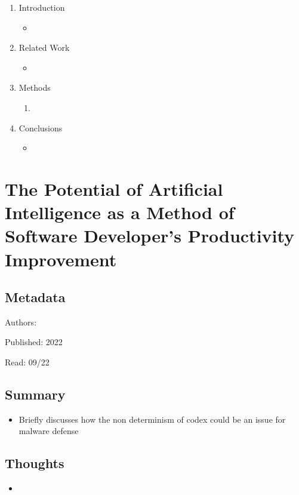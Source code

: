 \documentclass{article}
\begin{document}
\begin{enumerate}
	\item Introduction
	\begin{itemize}
		\item 
	\end{itemize}
	\item Related Work
	\begin{itemize}
		\item 
	\end{itemize}
	\item Methods
	\begin{enumerate}
		\item 
	\end{enumerate}
	\item Conclusions
	\begin{itemize}
		\item 
	\end{itemize}
\end{enumerate}

\pagebreak


\section*{The Potential of Artificial Intelligence as a Method of Software Developer's Productivity Improvement}

\subsection*{Metadata}

\noindent Authors: 

\noindent Published: 2022

\noindent Read: 09/22

\subsection*{Summary}
\begin{itemize}
	\item Briefly discusses how the non determinism of codex could be an issue for malware defense
\end{itemize}

\subsection*{Thoughts}
\begin{itemize}
	\item
\end{itemize}
\end{document}
